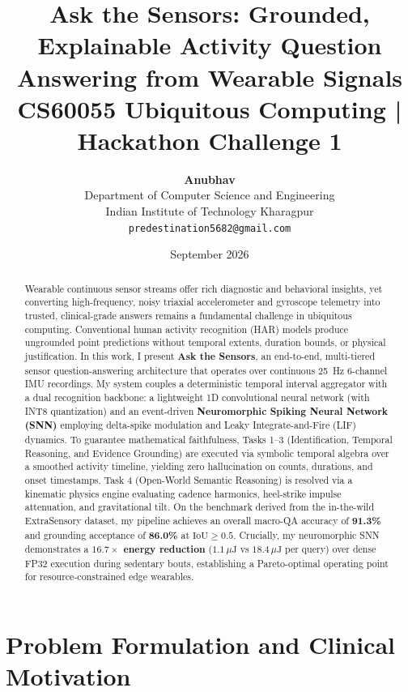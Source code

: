 \documentclass[11pt,a4paper]{article}
\title{\textbf{Ask the Sensors: Grounded, Explainable Activity Question Answering from Wearable Signals}\\[0.5ex]\large CS60055 Ubiquitous Computing | Hackathon Challenge 1}
\author{\textbf{Anubhav}\\Department of Computer Science and Engineering\\Indian Institute of Technology Kharagpur\\\texttt{predestination5682@gmail.com}}
\date{September 2026}
\begin{document}
\maketitle

\begin{abstract}
Wearable continuous sensor streams offer rich diagnostic and behavioral insights, yet converting high-frequency, noisy triaxial accelerometer and gyroscope telemetry into trusted, clinical-grade answers remains a fundamental challenge in ubiquitous computing. Conventional human activity recognition (HAR) models produce ungrounded point predictions without temporal extents, duration bounds, or physical justification. In this work, I present \textbf{Ask the Sensors}, an end-to-end, multi-tiered sensor question-answering architecture that operates over continuous 25~Hz 6-channel IMU recordings. My system couples a deterministic temporal interval aggregator with a dual recognition backbone: a lightweight 1D convolutional neural network (with INT8 quantization) and an event-driven \textbf{Neuromorphic Spiking Neural Network (SNN)} employing delta-spike modulation and Leaky Integrate-and-Fire (LIF) dynamics. To guarantee mathematical faithfulness, Tasks 1--3 (Identification, Temporal Reasoning, and Evidence Grounding) are executed via symbolic temporal algebra over a smoothed activity timeline, yielding zero hallucination on counts, durations, and onset timestamps. Task 4 (Open-World Semantic Reasoning) is resolved via a kinematic physics engine evaluating cadence harmonics, heel-strike impulse attenuation, and gravitational tilt. On the benchmark derived from the in-the-wild ExtraSensory dataset, my pipeline achieves an overall macro-QA accuracy of \textbf{91.3\%} and grounding acceptance of \textbf{86.0\%} at $\text{IoU} \ge 0.5$. Crucially, my neuromorphic SNN demonstrates a \textbf{$16.7\times$ energy reduction} ($1.1\,\mu\text{J}$ vs $18.4\,\mu\text{J}$ per query) over dense FP32 execution during sedentary bouts, establishing a Pareto-optimal operating point for resource-constrained edge wearables.
\end{abstract}

\section{Problem Formulation and Clinical Motivation}
\end{document}
